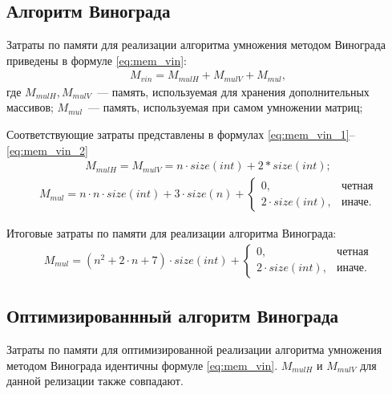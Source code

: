 \subsection*{Алгоритм Винограда}
Затраты по памяти для реализации алгоритма умножения методом Винограда приведены в формуле \ref{eq:mem_vin}:
\begin{equation}
	\label{eq:mem_vin}
	\begin{gathered}
		M_{vin} = M_{mulH} + M_{mulV} + M_{mul},
	\end{gathered}
\end{equation}
где $M_{mulH}, M_{mulV}$~--- память, используемая для хранения дополнительных массивов;
\newline $M_{mul}$~--- память, используемая при самом умножении матриц;

Соответствующие затраты представлены в формулах \ref{eq:mem_vin_1}--\ref{eq:mem_vin_2}
\begin{equation}
	\label{eq:mem_vin_1}
	\begin{gathered}
		M_{mulH} = M_{mulV} = n \cdot size(int) + 2 * size(int);
	\end{gathered}
\end{equation}
\begin{equation}
	\label{eq:mem_vin_2}
	\begin{gathered}
		M_{mul} = n \cdot n \cdot size(int) + 3 \cdot size(n) +
			\begin{cases}
				0, & \text{четная} \\
				2 \cdot size(int), & \text{иначе}.
			\end{cases}
	\end{gathered}
\end{equation}

Итоговые затраты по памяти для реализации алгоритма Винограда:
\begin{equation}
	\label{eq:mem_vin_res}
	\begin{gathered}
		M_{mul} = (n^{2} + 2 \cdot n + 7) \cdot size(int) +
			\begin{cases}
				0, & \text{четная} \\
				2 \cdot size(int), & \text{иначе}.
			\end{cases}
	\end{gathered}
\end{equation}

\subsection*{Оптимизированнный алгоритм Винограда}
Затраты по памяти для оптимизированной реализации алгоритма умножения методом Винограда идентичны формуле \ref{eq:mem_vin}.
$M_{mulH}$ и $M_{mulV}$ для данной релизации также совпадают.

